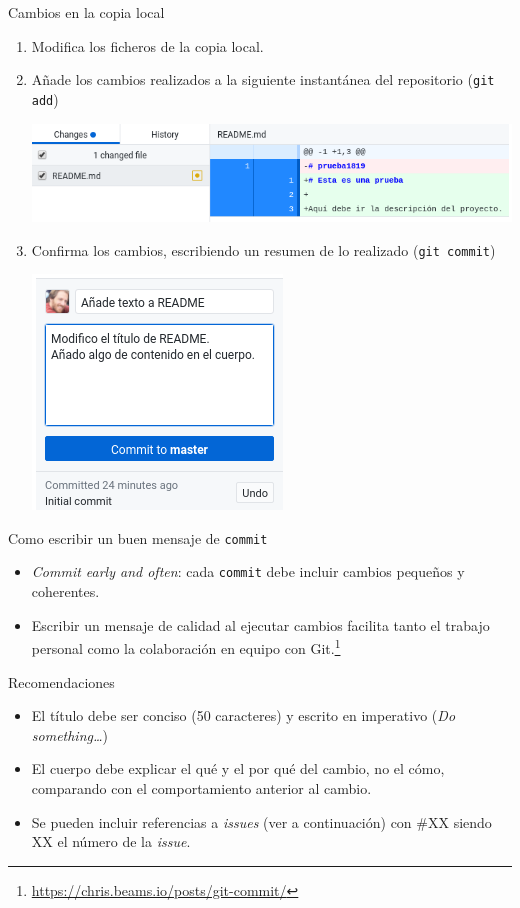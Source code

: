 \documentclass[xcolor={usenames,svgnames,dvipsnames}]{beamer}
\begin{document}
\begin{frame}[fragile,label={sec:org9e7e0d1}]{Cambios en la copia local}
 \begin{enumerate}
\item Modifica los ficheros de la copia local.
\item Añade los cambios realizados a la siguiente \guillemotleft{}instantánea\guillemotright{} del repositorio (\texttt{git add}) \begin{center}
\includegraphics[width=.9\linewidth]{figs/git_add.png}
\end{center}
\item Confirma los cambios, escribiendo un resumen de lo realizado (\texttt{git commit})
\begin{center}
\includegraphics[height=0.3\textheight]{figs/git_commit.png}
\end{center}
\end{enumerate}
\end{frame}
\begin{frame}[fragile,label={sec:org51ac2a6}]{Como escribir un buen mensaje de \texttt{commit}}
 \begin{itemize}
\item \emph{Commit early and often}: cada \texttt{commit} debe incluir cambios pequeños y coherentes.

\item Escribir un mensaje de calidad al ejecutar cambios facilita tanto el trabajo personal como la colaboración en equipo con Git.\footnote{\url{https://chris.beams.io/posts/git-commit/}}
\end{itemize}
\begin{block}{Recomendaciones}
\begin{itemize}
\item El \alert{título} debe ser \alert{conciso} (50 caracteres) y escrito en imperativo (\emph{Do something\ldots{}})
\item El \alert{cuerpo} debe explicar \alert{el qué y el por qué del cambio}, no el cómo, comparando con el comportamiento anterior al cambio.
\item Se pueden incluir referencias a \emph{issues} (ver a continuación) con \#XX siendo XX el número de la \emph{issue}.
\end{itemize}
\end{block}
\end{frame}
\end{document}
